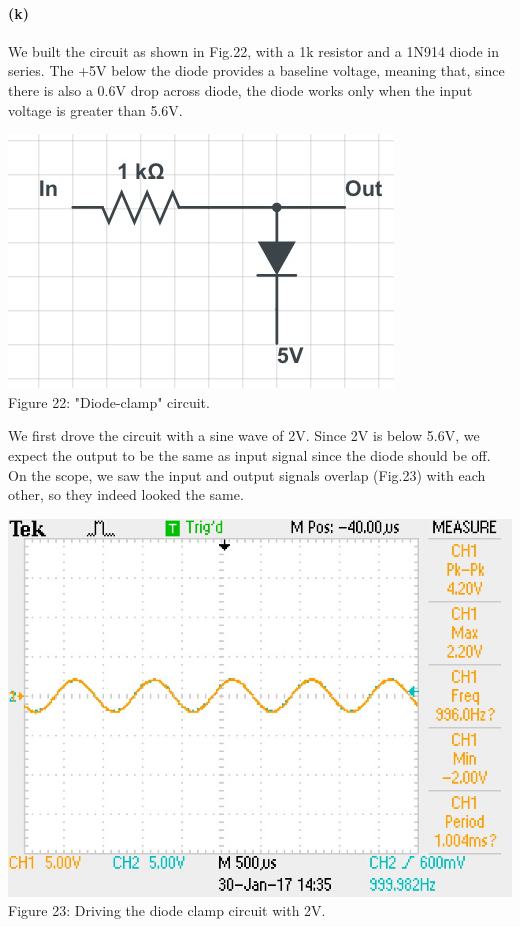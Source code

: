 \documentclass[]{article}
\begin{document}
	\paragraph{ (k)} 	
	We built the circuit as shown in Fig.22, with a 1k resistor and a 1N914 diode in series. The +5V below the diode provides a baseline voltage, meaning that, since there is also a 0.6V drop across diode, the diode works only when the input voltage is greater than 5.6V. 
		\begin{center}
			\includegraphics[scale=0.4]{k_circuit}\\
			Figure 22: "Diode-clamp" circuit.
		\end{center}
We first drove the circuit with a sine wave of 2V. Since 2V is below 5.6V, we expect the output to be the same as input signal since the diode should be off. On the scope, we saw the input and output signals overlap (Fig.23) with each other, so they indeed looked the same.
		\begin{center}
			\includegraphics[scale=0.8]{k_below}\\
			Figure 23: Driving the diode clamp circuit with 2V.
		\end{center}
\end{document}
